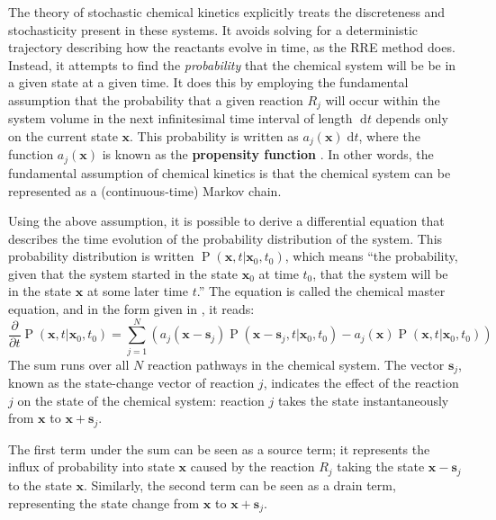 \documentclass[english,letterpaper,12pt]{report}
\newcommand{\defkeywd}[1]{\textbf{#1}}
\newcommand{\dee}{\;\mathrm{d}}
\renewcommand{\vec}[1]{\ensuremath{\mathbf{#1}}}
\DeclareMathOperator{\Prob}{P}
\begin{document}
\begin{doublespacing}
The theory of stochastic chemical kinetics explicitly treats the discreteness and stochasticity present in these systems. It avoids solving for a deterministic trajectory describing how the reactants evolve in time, as the RRE method does. Instead, it attempts to find the \emph{probability} that the chemical system will be be in a given state at a given time. It does this by employing the fundamental assumption that the probability that a given reaction $R_j$ will occur within the system volume in the next infinitesimal time interval of length $\dee t$ depends only on the current state $\vec{x}$. This probability is written as $a_j(\vec{x}) \dee t$, where the function $a_j(\vec{x})$ is known as the \defkeywd{propensity function} \cite{gillespie-ssa}. In other words, the fundamental assumption of chemical kinetics is that the chemical system can be represented as a (continuous-time) Markov chain.

Using the above assumption, it is possible to derive a differential equation that describes the time evolution of the probability distribution of the system. This probability distribution is written $\Prob(\vec{x}, t | \vec{x}_0, t_0)$, which means ``the probability, given that the system started in the state $\vec{x}_0$ at time $t_0$, that the system will be in the state $\vec{x}$ at some later time $t$.'' The equation is called the chemical master equation, and in the form given in \cite{gillespie-ssa}, it reads:
\begin{equation}
    \frac{\partial}{\partial t} \Prob(\vec{x}, t | \vec{x}_0, t_0) = \sum_{j=1}^N \left( a_j (\vec{x} - \vec{s}_j) \Prob(\vec{x} - \vec{s}_j, t | \vec{x}_0, t_0) - a_j(\vec{x}) \Prob(\vec{x}, t | \vec{x}_0, t_0) \right)
    \label{eq:master-eqn-gillespie}
\end{equation}
The sum runs over all $N$ reaction pathways in the chemical system. The vector $\vec{s}_j$, known as the state-change vector of reaction $j$, indicates the effect of the reaction $j$ on the state of the chemical system: reaction $j$ takes the state instantaneously from $\vec{x}$ to $\vec{x} + \vec{s}_j$.

The first term under the sum can be seen as a source term; it represents the influx of probability into state $\vec{x}$ caused by the reaction $R_j$ taking the state $\vec{x} - \vec{s}_j$ to the state $\vec{x}$. Similarly, the second term can be seen as a drain term, representing the state change from $\vec{x}$ to $\vec{x} + \vec{s}_j$.


\end{doublespacing}
\end{document}
